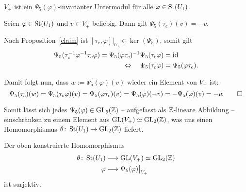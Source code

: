 \begin{proposition}
	$V_+$ ist ein $\Psi_5(\varphi)$-invarianter Untermodul für alle $\varphi \in \operatorname{St}(U_1)$.
\end{proposition}

\begin{beweis}
	Seien $\varphi \in \operatorname{St}(U_1)$ und $v \in V_+$ beliebig. Dann gilt $\Psi_5(\tau_c)(v) = -v$.

	Nach Proposition~\ref{claim} ist $[\tau_c,\varphi]\big|_{U_1} \in \ker(\Psi_5)$, somit gilt
	\begin{equation}
	\begin{aligned}
		\Psi_5(\tau_c^{-1} \varphi^{-1} \tau_c \varphi) = \Psi_5(\varphi \tau_c)^{-1} \Psi_5(\tau_c \varphi) &= \operatorname{id} \\
		\Leftrightarrow \quad \Psi_5(\tau_c \varphi) &= \Psi_5(\varphi \tau_c).
	\end{aligned}
	\end{equation}
	
	Damit folgt nun, dass $w := \Psi_5(\varphi)(v)$ wieder ein Element von $V_+$ ist:
	\[
		\Psi_5(\tau_c)(w) = \Psi_5(\tau_c \varphi)(v) = \Psi_5(\varphi \tau_c)(v) = \Psi_5(\varphi)(-v) = -\Psi_5(\varphi)(v) = -w \qedhere
	\]
\end{beweis}

Somit lässt sich jedes $\Psi_5(\varphi) \in \operatorname{GL}_5(\mathbb{Z})$ -- aufgefasst als $\mathbb{Z}$-lineare Abbildung -- einschränken zu einem Element aus $\operatorname{GL}(V_+) \simeq \operatorname{GL}_2(\mathbb{Z})$, was uns einen Homomorphismus $\theta \colon \operatorname{St}(U_1) \rightarrow \operatorname{GL}_2(\mathbb{Z})$ liefert. 

\begin{proposition}
	Der oben konstruierte Homomorphismus 
	\begin{equation}
	\begin{aligned}
		\theta\colon \operatorname{St}(U_1) &\longrightarrow \operatorname{GL}(V_+) \simeq \operatorname{GL}_2(\mathbb{Z}) \\
		\varphi &\longmapsto \Psi_5(\varphi)\big|_{V_+}
	\end{aligned}
	\end{equation}
	ist surjektiv.
\end{proposition}

